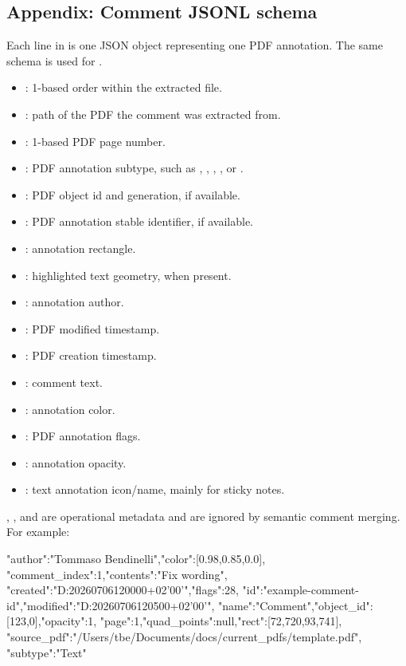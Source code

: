 {\subsection*{Appendix: Comment JSONL schema}
\label{app:comment-jsonl-schema}
Each line in  is one JSON object representing one PDF annotation.
The same schema is used for .
\begin{itemize}
  \item {}: 1-based order within the extracted file.
  \item {}: path of the PDF the comment was extracted from.
  \item {}: 1-based PDF page number.
  \item {}: PDF annotation subtype, such as , , , , or .
  \item {}: PDF object id and generation, if available.
  \item {}: PDF annotation  stable identifier, if available.
  \item {}: annotation rectangle.
  \item {}: highlighted text geometry, when present.
  \item {}: annotation author.
  \item {}: PDF modified timestamp.
  \item {}: PDF creation timestamp.
  \item {}: comment text.
  \item {}: annotation color.
  \item {}: PDF annotation flags.
  \item {}: annotation opacity.
  \item {}: text annotation icon/name, mainly for sticky notes.
\end{itemize}
, , and  are operational metadata and are ignored by semantic comment merging.
For example:
\begin{DocCode}
{"author":"Tommaso Bendinelli","color":[0.98,0.85,0.0],
 "comment_index":1,"contents":"Fix wording",
 "created":"D:20260706120000+02'00'","flags":28,
 "id":"example-comment-id","modified":"D:20260706120500+02'00'",
 "name":"Comment","object_id":[123,0],"opacity":1,
 "page":1,"quad_points":null,"rect":[72,720,93,741],
 "source_pdf":"/Users/tbe/Documents/docs/current_pdfs/template.pdf",
 "subtype":"Text"}
\end{DocCode}

}
